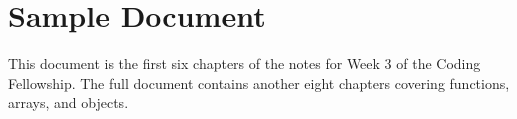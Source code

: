 \newpage

\section*{Sample Document}

This document is the first six chapters of the notes for Week 3 of the Coding Fellowship. The full document contains another eight chapters covering functions, arrays, and objects.
